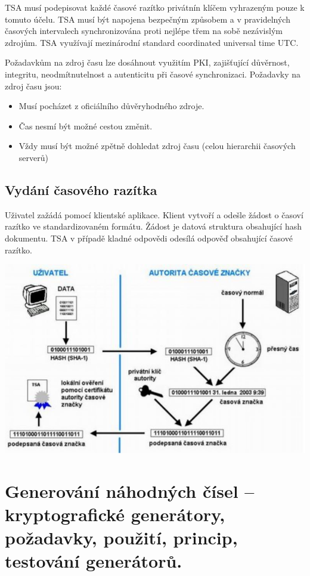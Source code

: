 TSA musí podepisovat každé časové razítko privátnín klíčem vyhrazeným pouze k tomuto účelu. TSA musí být napojena bezpečným způsobem a v pravidelných časových intervalech synchronizována proti nejlépe třem na sobě nezávislým zdrojům. TSA využívají mezinárodní standard coordinated universal time UTC.

\noindent Požadavkům na zdroj času lze dosáhnout využitím PKI, zajišťující důvěrnost, integritu, neodmítnutelnost a autenticitu při časové synchronizaci. Požadavky na zdroj času jsou:

\begin{itemize}[noitemsep]
    \item Musí pocházet z oficiálního důvěryhodného zdroje.
    \item Čas nesmí být možné cestou změnit.
    \item Vždy musí být možné zpětně dohledat zdroj času (celou hierarchii časových serverů)
\end{itemize}

\subsection{Vydání časového razítka}

Uživatel zažádá pomocí klientské aplikace. Klient vytvoří a odešle žádost o časoví razítko ve standardizovaném formátu. Žádost je datová struktura obsahující hash dokumentu. TSA v případě kladné odpovědi odesílá odpověď obsahující časové razítko.

\begin{center}
\includegraphics[scale=0.7]{images/Timestamp.jpg}
\end{center}

\clearpage
\section{Generování náhodných čísel -- kryptografické generátory, požadavky, použití, princip, testování generátorů.}

